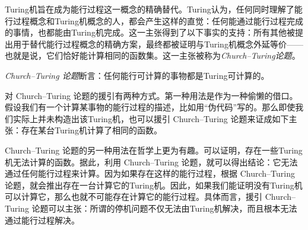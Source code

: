 \documentclass[../../../include/open-logic-section]{subfiles}
\begin{document}

Turing机旨在成为能行过程这一概念的精确替代。Turing认为，任何同时理解了能行过程概念和Turing机概念的人，都会产生这样的直觉：任何能通过能行过程完成的事情，也都能由Turing机完成。这一主张得到了以下事实的支持：所有其他被提出用于替代能行过程概念的精确方案，最终都被证明与Turing机概念外延等价——也就是说，它们恰好能计算相同的函数集。这一主张被称为\emph{Church--Turing论题}。

\begin{defn}
\emph{Church--Turing 论题}断言：任何能行可计算的事物都是Turing可计算的。
\end{defn}

对 Church--Turing 论题的援引有两种方式。第一种用法是作为一种偷懒的借口。假设我们有一个计算某事物的能行过程的描述，比如用“伪代码”写的。那么即使我们实际上并未构造出该Turing机，也可以援引 Church--Turing 论题来证成如下主张：存在某台Turing机计算了相同的函数。

Church--Turing 论题的另一种用法在哲学上更为有趣。可以证明，存在一些Turing机无法计算的函数。据此，利用 Church--Turing 论题，就可以得出结论：它无法通过任何能行过程来计算。因为如果存在这样的能行过程，根据 Church--Turing 论题，就会推出存在一台计算它的Turing机。因此，如果我们能证明没有Turing机可以计算它，那么也就不可能存在计算它的能行过程。具体而言，援引 Church--Turing 论题可以主张：所谓的停机问题不仅无法由Turing机解决，而且根本无法通过能行过程解决。
\end{document}
